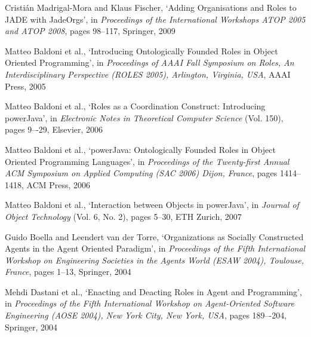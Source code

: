 \begin{thebibliography}{99}
Cristián Madrigal-Mora and Klaus Fischer,
`Adding Organisations and Roles to JADE with JadeOrgs',
in \textit{Proceedings of the International Workshops ATOP 2005 and ATOP 2008},
pages 98--117,
Springer, 2009


Matteo Baldoni et al., %
`Introducing Ontologically Founded Roles in Object Oriented Programming',
in \textit{Proceedings of AAAI Fall Symposium on Roles, An Interdisciplinary Perspective (ROLES 2005), Arlington, Virginia, USA},
AAAI Press, 2005

Matteo Baldoni et al., %
`Roles as a Coordination Construct: Introducing powerJava',
in \textit{Electronic Notes in Theoretical Computer Science} (Vol. 150),
pages 9–-29,
Elsevier, 2006

Matteo Baldoni et al., %
`powerJava: Ontologically Founded Roles in Object Oriented Programming Languages',
in \textit{Proceedings of the Twenty-first Annual ACM Symposium on Applied Computing (SAC 2006) Dijon, France},
pages 1414--1418,
ACM Press, 2006

Matteo Baldoni et al., %
`Interaction between Objects in powerJava',
in \textit{Journal of Object Technology} (Vol. 6, No. 2),
pages 5--30,
ETH Zurich, 2007


Guido Boella and Leendert van der Torre,
`Organizations as Socially Constructed Agents in the Agent Oriented Paradigm',
in \textit{Proceedings of the Fifth International Workshop on Engineering Societies in the Agents World (ESAW 2004), Toulouse, France},
pages 1--13,
Springer, 2004

Mehdi Dastani et al., %
`Enacting and Deacting Roles in Agent and Programming',
in \textit{Proceedings of the Fifth International Workshop on Agent-Oriented Software Engineering (AOSE 2004), New York City, New York, USA},
pages 189–-204,
Springer, 2004


\end{thebibliography}
